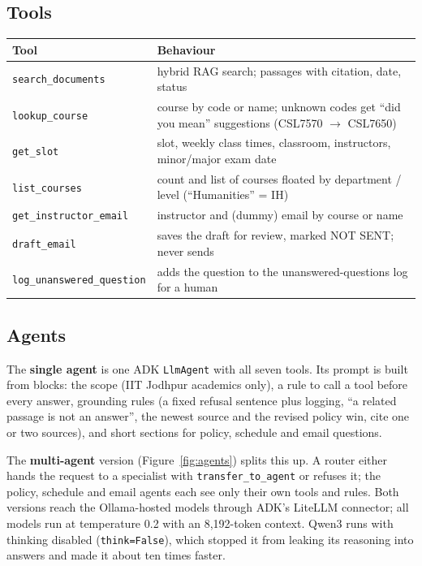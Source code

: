 \documentclass[10pt,a4paper]{article}
\newcommand{\code}[1]{\texttt{\small #1}}
\begin{document}
\subsection{Tools}
\noindent\begin{minipage}{\linewidth}
\centering\small
\begin{tabularx}{\linewidth}{l X}
\toprule
Tool & Behaviour \\
\midrule
\code{search\_documents} & hybrid RAG search; passages with citation, date, status \\
\code{lookup\_course} & course by code or name; unknown codes get ``did you mean'' suggestions (CSL7570 $\rightarrow$ CSL7650) \\
\code{get\_slot} & slot, weekly class times, classroom, instructors, minor/major exam date \\
\code{list\_courses} & count and list of courses floated by department / level (``Humanities'' = IH) \\
\code{get\_instructor\_email} & instructor and (dummy) email by course or name \\
\code{draft\_email} & saves the draft for review, marked NOT SENT; never sends \\
\code{log\_unanswered\_question} & adds the question to the unanswered-questions log for a human \\
\bottomrule
\end{tabularx}
\end{minipage}
\medskip

\subsection{Agents}
The \textbf{single agent} is one ADK \code{LlmAgent} with all seven tools. Its prompt is built from blocks: the
scope (IIT Jodhpur academics only), a rule to call a tool before every answer, grounding rules (a fixed refusal
sentence plus logging, ``a related passage is not an answer'', the newest source and the revised policy win, cite
one or two sources), and short sections for policy, schedule and email questions.

The \textbf{multi-agent} version (Figure~\ref{fig:agents}) splits this up. A router either hands the request to a
specialist with \code{transfer\_to\_agent} or refuses it; the policy, schedule and email agents each see only their
own tools and rules. Both versions reach the Ollama-hosted models through ADK's LiteLLM connector; all models run
at temperature 0.2 with an 8{,}192-token context. Qwen3 runs with thinking
disabled (\code{think=False}), which stopped it from leaking its reasoning into answers and made it about ten times
faster.
\end{document}
